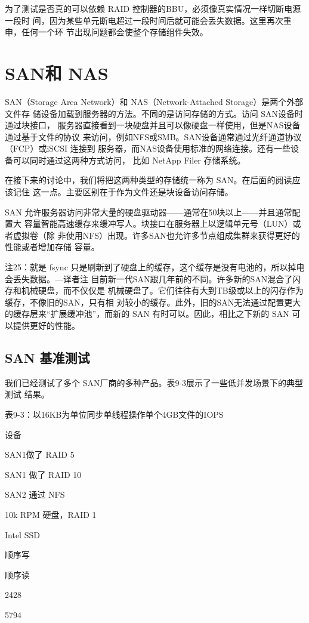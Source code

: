 为了测试是否真的可以依赖 RAID 控制器的BBU，必须像真实情况一样切断电源一段时
间，因为某些单元断电超过一段时间后就可能会丢失数据。这里再次重申，任何一个环
节出现问题都会使整个存储组件失效。

\section{SAN和 NAS}
SAN（Storage Area Network）和 NAS（Network-Attached Storage）是两个外部文件存
储设备加载到服务器的方法。不同的是访问存储的方式。访问 SAN设备时通过块接口，
服务器直接看到一块硬盘并且可以像硬盘一样使用，但是NAS设备通过基于文件的协议
来访问，例如NFS或SMB。SAN设备通常通过光纤通道协议（FCP）或iSCSI 连接到
服务器，而NAS设备使用标准的网络连接。还有一些设备可以同时通过这两种方式访问，
比如 NetApp Filer 存储系统。

在接下来的讨论中，我们将把这两种类型的存储统一称为 SAN。在后面的阅读应该记住
这一点。主要区别在于作为文件还是块设备访问存储。

SAN 允许服务器访问非常大量的硬盘驱动器——通常在50块以上——并且通常配置大
容量智能高速缓存来缓冲写人。块接口在服务器上以逻辑单元号（LUN）或者虚拟卷（除
非使用NFS）出现。许多SAN也允许多节点组成集群来获得更好的性能或者增加存储
容量。

注25：就是 fsync 只是刷新到了硬盘上的缓存，这个缓存是没有电池的，所以掉电会丢失数据。—译者注
目前新一代SAN跟几年前的不同。许多新的SAN混合了闪存和机械硬盘，而不仅仅是
机械硬盘了。它们往往有大到TB级或以上的闪存作为缓存，不像旧的SAN，只有相
对较小的缓存。此外，旧的SAN无法通过配置更大的缓存层来“扩展缓冲池”，而新的
SAN 有时可以。因此，相比之下新的 SAN 可以提供更好的性能。

\subsection{SAN 基准测试}
我们已经测试了多个 SAN厂商的多种产品。表9-3展示了一些低并发场景下的典型测试
结果。

表9-3：以16KB为单位同步单线程操作单个4GB文件的IOPS

设备

SAN1做了 RAID 5

SAN1 做了 RAID 10

SAN2 通过 NFS

10k RPM 硬盘，RAID 1

Intel SSD

顺序写

顺序读

2428

5794

